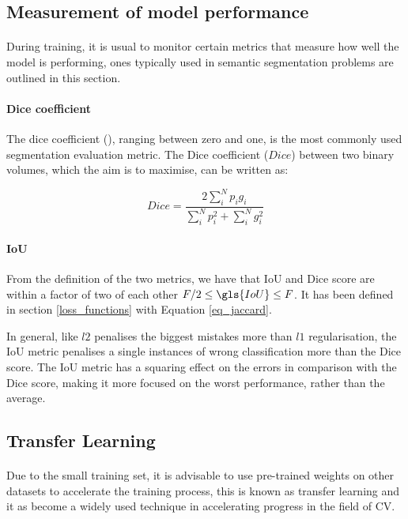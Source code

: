 \subsection{Measurement of model performance} \label{performance_measures}
\paragraph{}
During training, it is usual to monitor certain metrics that measure how well the model is performing, ones typically used in semantic segmentation problems are outlined in this section.
\paragraph{Dice coefficient}
The dice coefficient (\cite{7785132}), ranging between zero and one, is the most commonly used segmentation evaluation metric. The Dice coefficient ($Dice$) between two binary volumes, which the aim is to maximise, can be written as:

\begin{equation}
    \label{eq_dice_coef}
    Dice=\frac{2\sum_{{i}}^{N}p_{i}g_{i}}{\sum_{i}^{N}p_{i}^{2}+\sum_{i}^{N}g_{{i}}^{2}}
\end{equation}

\paragraph{\gls{IoU}}
From the definition of the two metrics, we have that \gls{IoU} and Dice score are within a factor of two of each other $F/2 \leq \gls{IoU} \leq F$. It has been defined in section \ref{loss_functions} with Equation \ref{eq_jaccard}.

In general, like $l2$ penalises the biggest mistakes more than $l1$ regularisation, the \gls{IoU} metric penalises a single instances of wrong classification more than the Dice score. The \gls{IoU} metric has a squaring effect on the errors in comparison with the Dice score, making it more focused on the worst performance, rather than the average.

\subsection{Transfer Learning} \label{transfer_learning}
\paragraph{}
Due to the small training set, it is advisable to use pre-trained weights on other datasets to accelerate the training process, this is known as transfer learning and it as become a widely used technique in accelerating progress in the field of \gls{CV}.

